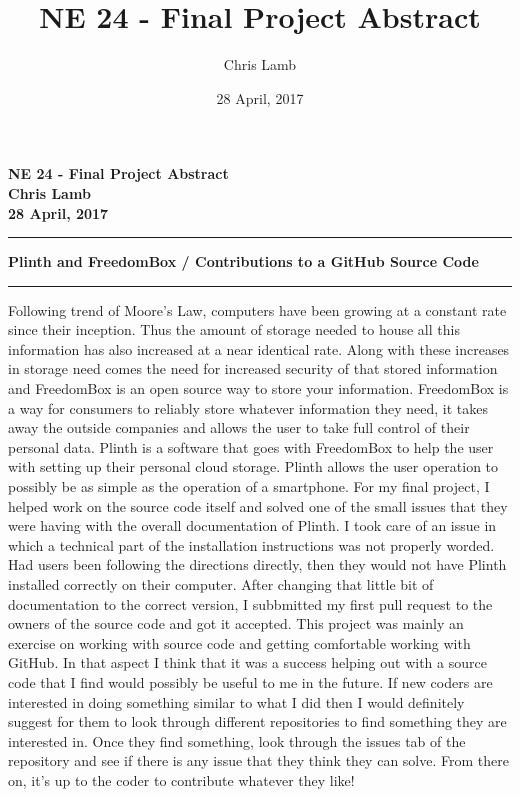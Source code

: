 \documentclass[12pt]{article}
\author{Chris Lamb}
\title{NE 24 - Final Project Abstract}
\date{28 April, 2017}
\begin{document}
\begin{center}
\textbf{NE 24 - Final Project Abstract \\ Chris Lamb \\ 28 April, 2017}
\end{center}
\noindent\rule{17cm}{1pt}

\begin{center}
\textbf{Plinth and FreedomBox / Contributions to a GitHub Source Code}
\rule{14cm}{0.4pt}
\end{center}

Following trend of Moore's Law, computers have been growing at a constant rate since their inception. Thus the amount of storage needed to house all this information has also increased at a near identical rate. Along with these increases in storage need comes the need for increased security of that stored information and FreedomBox is an open source way to store your information. FreedomBox is a way for consumers to reliably store whatever information they need, it takes away the outside companies and allows the user to take full control of their personal data. Plinth is a software that goes with FreedomBox to help the user with setting up their personal cloud storage. Plinth allows the user operation to possibly be as simple as the operation of a smartphone. For my final project, I helped work on the source code itself and solved one of the small issues that they were having with the overall documentation of Plinth. I took care of an issue in which a technical part of the installation instructions was not properly worded. Had users been following the directions directly, then they would not have Plinth installed correctly on their computer. After changing that little bit of documentation to the correct version, I subbmitted my first pull request to the owners of the source code and got it accepted. This project was mainly an exercise on working with source code and getting comfortable working with GitHub. In that aspect I think that it was a success helping out with a source code that I find would possibly be useful to me in the future. If new coders are interested in doing something similar to what I did then I would definitely suggest for them to look through different repositories to find something they are interested in. Once they find something, look through the issues tab of the repository and see if there is any issue that they think they can solve. From there on, it's up to the coder to contribute whatever they like!
\end{document}
